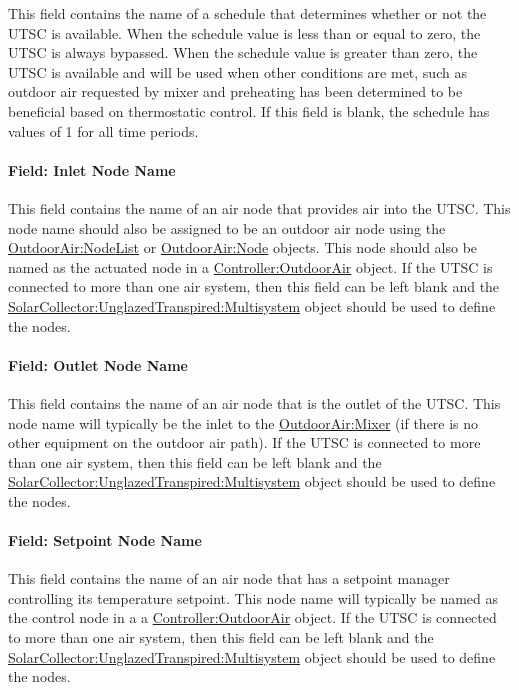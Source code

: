 This field contains the name of a schedule that determines whether or not the UTSC is available. When the schedule value is less than or equal to zero, the UTSC is always bypassed. When the schedule value is greater than zero, the UTSC is available and will be used when other conditions are met, such as outdoor air requested by mixer and preheating has been determined to be beneficial based on thermostatic control. If this field is blank, the schedule has values of 1 for all time periods.

\paragraph{Field: Inlet Node Name}\label{field-inlet-node-name-2-003}

This field contains the name of an air node that provides air into the UTSC. This node name should also be assigned to be an outdoor air node using the \hyperref[outdoorairnodelist]{\hyperref[outdoorairnode]{OutdoorAir:Node}List} or \hyperref[outdoorairnode]{OutdoorAir:Node} objects. This node should also be named as the actuated node in a \hyperref[controlleroutdoorair]{Controller:OutdoorAir} object. If the UTSC is connected to more than one air system, then this field can be left blank and the \hyperref[solarcollectorunglazedtranspiredmultisystem]{SolarCollector:UnglazedTranspired:Multisystem} object should be used to define the nodes.

\paragraph{Field: Outlet Node Name}\label{field-outlet-node-name-2-003}

This field contains the name of an air node that is the outlet of the UTSC. This node name will typically be the inlet to the \hyperref[outdoorairmixer]{OutdoorAir:Mixer} (if there is no other equipment on the outdoor air path). If the UTSC is connected to more than one air system, then this field can be left blank and the \hyperref[solarcollectorunglazedtranspiredmultisystem]{SolarCollector:UnglazedTranspired:Multisystem} object should be used to define the nodes.

\paragraph{Field: Setpoint Node Name}\label{field-setpoint-node-name-000}

This field contains the name of an air node that has a setpoint manager controlling its temperature setpoint. This node name will typically be named as the control node in a a \hyperref[controlleroutdoorair]{Controller:OutdoorAir} object. If the UTSC is connected to more than one air system, then this field can be left blank and the \hyperref[solarcollectorunglazedtranspiredmultisystem]{SolarCollector:UnglazedTranspired:Multisystem} object should be used to define the nodes.

